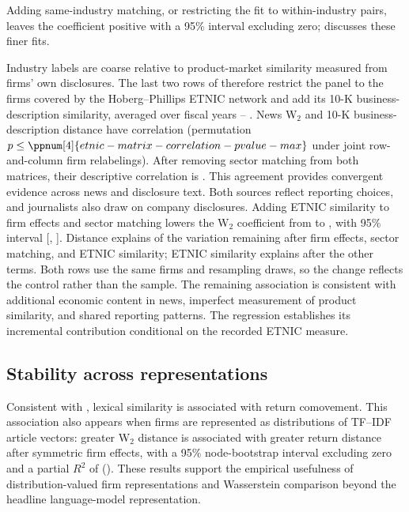 Adding same-industry matching, or restricting the fit to within-industry
pairs, leaves the coefficient positive with a 95\% interval excluding zero;
 discusses these finer fits.

Industry labels are coarse relative to product-market similarity measured
from firms' own disclosures.
The last two rows of  therefore restrict the
panel to the  firms covered by the Hoberg--Phillips
ETNIC network and add its 10-K business-description similarity, averaged over
fiscal years --
\citep{hoberg2025scope}.
News W$_2$ and 10-K business-description distance have correlation
(permutation $p\le\ppnum[4]{etnic-matrix-correlation-pvalue-max}$ under
   joint row-and-column
firm relabelings).
After removing sector matching from both matrices, their descriptive
correlation is .
This agreement provides convergent evidence across news and disclosure text.
Both sources reflect reporting choices, and journalists also draw on company
disclosures.
Adding ETNIC similarity to firm effects and sector matching lowers the W$_2$
coefficient from  to
, with 95\% interval
[,
].
Distance explains  of the variation
remaining after firm effects, sector matching, and ETNIC similarity; ETNIC
similarity explains  after
the other terms.
Both rows use the same firms and resampling draws, so the change reflects the
control rather than the sample.
The remaining association is consistent with additional economic content in
news, imperfect measurement of product similarity, and shared reporting
patterns.
The regression establishes its incremental contribution conditional on the
recorded ETNIC measure.



\subsection{Stability across representations}
\label{sec:representation-sensitivity}

Consistent with \citet{box2018qualitative}, lexical similarity is associated
with return comovement.
This association also appears when firms are represented as distributions
of TF--IDF article vectors: greater W$_2$ distance is associated with greater
return distance after symmetric firm effects, with a 95\% node-bootstrap
interval excluding zero and a partial $R^2$ of
().
These results support the empirical usefulness of distribution-valued firm
representations and Wasserstein comparison beyond the headline
language-model representation.

